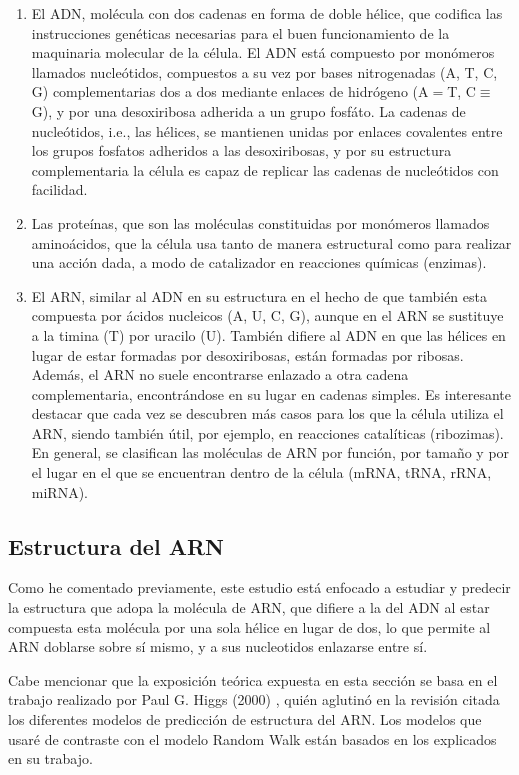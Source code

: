 \documentclass[a4paper,11pt,titlepage]{article}
\theoremstyle{definition}
\begin{document}
\begin{enumerate}
    \item El ADN, molécula con dos cadenas en forma de doble hélice, que codifica las instrucciones genéticas necesarias para el buen funcionamiento de la maquinaria molecular de la célula. El ADN está compuesto por monómeros llamados nucleótidos, compuestos a su vez por bases nitrogenadas (A, T, C, G) complementarias dos a dos mediante enlaces de hidrógeno (A$=$T, C$\equiv$G), y por una desoxiribosa adherida a un grupo fosfáto. La cadenas de nucleótidos, i.e., las hélices, se mantienen unidas por enlaces covalentes entre los grupos fosfatos adheridos a las desoxiribosas, y por su estructura complementaria la célula es capaz de replicar las cadenas de nucleótidos con facilidad.
    \item Las proteínas, que son las moléculas constituidas por monómeros llamados aminoácidos, que la célula usa tanto de manera estructural como para realizar una acción dada, a modo de catalizador en reacciones químicas (enzimas).
    \item El ARN, similar al ADN en su estructura en el hecho de que también esta compuesta por ácidos nucleicos (A, U, C, G), aunque en el ARN se sustituye a la timina (T) por uracilo (U). También difiere al ADN en que las hélices en lugar de estar formadas por desoxiribosas, están formadas por ribosas. Además, el ARN no suele encontrarse enlazado a otra cadena complementaria, encontrándose en su lugar en cadenas simples. Es interesante destacar que cada vez se descubren más casos para los que la célula utiliza el ARN, siendo también útil, por ejemplo, en reacciones catalíticas (ribozimas). En general, se clasifican las moléculas de ARN por función, por tamaño y por el lugar en el que se encuentran dentro de la célula (mRNA, tRNA, rRNA, miRNA).
\end{enumerate}


\subsection{Estructura del ARN}\label{subsec:arn}

Como he comentado previamente, este estudio está enfocado a estudiar y predecir la estructura que adopa la molécula de ARN, que difiere a la del ADN al estar compuesta esta molécula por una sola hélice en lugar de dos, lo que permite al ARN doblarse sobre sí mismo, y a sus nucleotidos enlazarse entre sí.

Cabe mencionar que la exposición teórica expuesta en esta sección se basa en el trabajo realizado por Paul G. Higgs (2000) \cite{phiggs}, quién aglutinó en la revisión citada los diferentes modelos de predicción de estructura del ARN. Los modelos que usaré de contraste con el modelo Random Walk están basados en los explicados en su trabajo.
\end{document}
